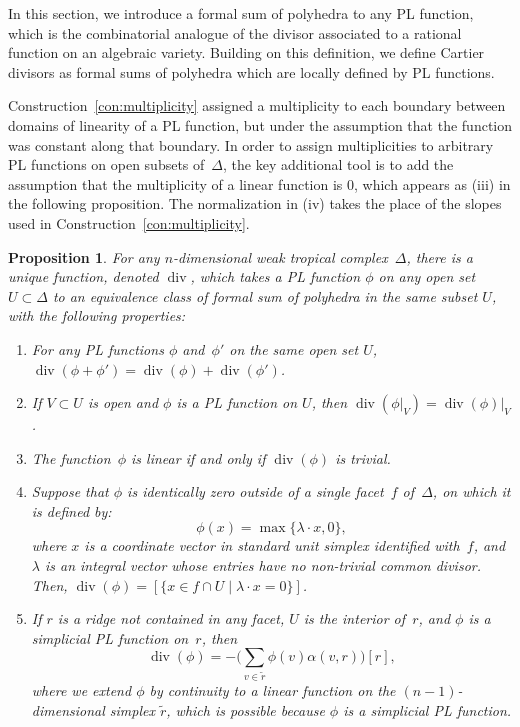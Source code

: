 \documentclass[11pt,reqno]{amsart}
\newtheorem{prop}[thm]{Proposition}
\theoremstyle{definition}
\renewcommand{\div}{\operatorname{div}}
\begin{document}
In this section, we introduce a formal sum of polyhedra to any PL function,
which is the combinatorial analogue of the divisor associated
to a rational function on an algebraic variety. Building on this definition, we
define Cartier divisors as formal sums of polyhedra which are locally defined by
PL functions.

Construction~\ref{con:multiplicity} assigned a multiplicity to each boundary
between domains of linearity of a PL function, but under the assumption that
the function was constant along that boundary. In order to assign multiplicities
to arbitrary PL functions on open subsets of~$\Delta$, the key additional tool
is to add the assumption that the multiplicity of a linear function is 0, which
appears as (iii) in the following proposition. The normalization in (iv) takes
the place of the slopes used in Construction~\ref{con:multiplicity}.

\begin{prop}\label{p:divisor-pl}
For any $n$-dimensional weak tropical complex~$\Delta$, there is a unique
function, denoted
$\div$, which takes a PL function $\phi$ on any open set $U \subset \Delta$ to
an equivalence class of formal sum of polyhedra in the same subset $U$, with the
following properties:
\begin{enumerate}
\item[(i)] For any PL functions $\phi$ and~$\phi'$ on the same open set $U$,
$\div(\phi + \phi') = \div(\phi) + \div(\phi')$.
\item[(ii)] If $V \subset U$ is open and $\phi$ is a PL function on $U$,
then $\div(\phi \vert_V)
= \div(\phi)\vert_V$.
\item[(iii)] The function~$\phi$ is linear 
 if and only if $\div(\phi)$ is trivial.
\item[(iv)] Suppose that $\phi$ is identically zero outside of a single facet~$f$
of~$\Delta$, on which it is defined by:
\begin{equation}\label{eq:piecewise}
\phi(x) = \max \{ \lambda \cdot x, 0\},
\end{equation}
where $x$ is a coordinate vector in standard unit simplex identified with~$f$,
and $\lambda$ is an integral vector whose entries have no
non-trivial common divisor. Then, $\div(\phi) = [\{x \in f \cap U \mid \lambda
\cdot x = 0\}]$.
\item[(v)]\label{it:ridge} If $r$ is a ridge not contained in any facet, $U$ is
the interior of~$r$, and $\phi$ is a simplicial PL function on~$r$, then
\begin{equation*}
\div(\phi) = -\bigg(\sum_{v \in \tilde r} \phi(v) \alpha(v, r)\bigg)[r],
\end{equation*}
where we extend $\phi$ by continuity to a linear function on the
$(n-1)$-dimensional simplex $\tilde r$, which is possible because $\phi$ is a
simplicial PL function.
\end{enumerate}
\end{prop}
\end{document}

